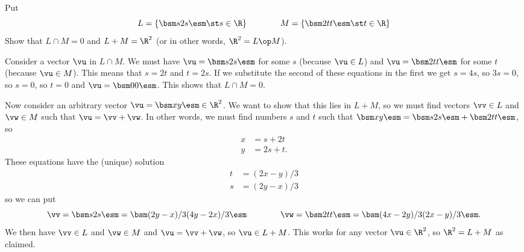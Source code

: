 \begin{exercise}\label{ex-inj-misc-v}
 Put 
 \[ L = \{\bsm s \\ 2s \esm \st s\in \R\} \hspace{4em}
    M = \{\bsm 2t \\ t \esm \st t\in \R\}
 \]
 Show that $L\cap M=0$ and $L+M=\R^2$ (or in other words,
 $\R^2=L\op M$). 
\end{exercise}
\begin{solution}
 Consider a vector $\vu$ in $L\cap M$.  We
 must have $\vu=\bsm s\\2s\esm$ for some $s$ (because
 $\vu\in L$) and $\vu=\bsm 2t\\ t\esm$ for some $t$ (because
 $\vu\in M$).  This means that $s=2t$ and $t=2s$.  If we
 substitute the second of these equations in the first we
 get $s=4s$, so $3s=0$, so $s=0$, so $t=0$ and
 $\vu=\bsm 0\\0\esm$.  This shows that $L\cap M=0$. 

 Now consider an arbitrary vector
 $\vu=\bsm x\\ y\esm\in\R^2$.  We want to show that this
 lies in $L+M$, so we must find vectors $\vv\in L$ and
 $\vw\in M$ such that $\vu=\vv+\vw$.  In other words, we
 must find numbers $s$ and $t$ such that
 $\bsm x\\ y\esm=\bsm s\\ 2s\esm + \bsm 2t\\ t\esm$,
 so 
 \begin{align*}
  x &= s+2t \\
  y &= 2s+t. 
 \end{align*}
 These equations have the (unique) solution
 \begin{align*}
  t &= (2x-y)/3 \\
  s &= (2y-x)/3 
 \end{align*}
 so we can put 
 \[ \vv = \bsm s\\ 2s\esm = \bsm (2y-x)/3 \\ (4y-2x)/3 \esm 
    \hspace{4em}
    \vw = \bsm 2t\\ t\esm = \bsm (4x-2y)/3 \\ (2x-y)/3 \esm. 
 \]
 We then have $\vv\in L$ and $\vw\in M$ and $\vu=\vv+\vw$,
 so $\vu\in L+M$.  This works for any vector $\vu\in\R^2$,
 so $\R^2=L+M$ as claimed. 
\end{solution}

